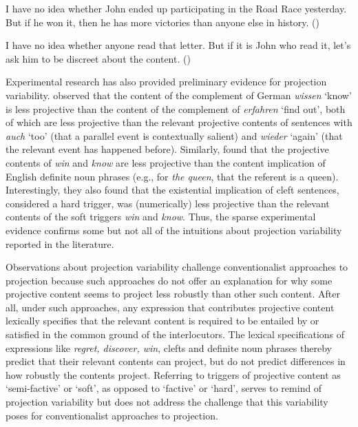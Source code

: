 \documentclass[11pt,fleqn]{article}
\newcommand{\6}{\mbox{$[\hspace*{-.6mm}[$}}
\newcommand{\9}{\mbox{$]\hspace*{-.6mm}]$}}
\def\infelic{{\leavevmode\llap{\#}}}
\begin{document}
\begin{exe}
\ex\label{hardsoft}
\begin{xlist}

\ex I have no idea whether John ended up participating in the Road Race yesterday. But if he won it, then he has more victories than anyone else in history. \hfill (\citealt[39]{abusch10})

\ex\infelic I have no idea whether anyone read that letter. But if it is John
who read it, let's ask him to be discreet about the content. \hfill (\citealt[40]{abusch10})

\end{xlist}
\end{exe}

Experimental research has also provided preliminary evidence for projection variability. \citet{xue-onea11} observed that the content of the complement of German {\em wissen} `know' is less projective than the content of the complement of {\em erfahren} `find out', both of which are less projective than the relevant projective contents of sentences with {\em auch} `too' (that a parallel event is contextually salient) and {\em wieder} `again' (that the relevant event has happened before). Similarly, \citet{smith-hall11} found that the projective contents of {\em win} and {\em know} are less projective than the content implication of English definite noun phrases (e.g., for {\em the queen}, that the referent is a queen). Interestingly, they also found that the existential implication of cleft sentences, considered a hard trigger, was (numerically) less projective than the relevant contents of the soft triggers {\em win} and {\em know}. Thus, the sparse experimental evidence confirms some but not all of the intuitions about projection variability reported in the literature.

Observations about projection variability challenge conventionalist approaches to projection because such approaches do not offer an explanation for why some projective content seems to project less robustly than other such content. After all, under such approaches, any expression that contributes projective content lexically specifies that the relevant content is required to be entailed by or satisfied in the common ground of the interlocutors. The lexical specifications of expressions like {\em regret, discover, win}, clefts and definite noun phrases thereby predict that their relevant contents can project, but do not predict differences in how robustly the contents project. Referring to triggers of projective content as `semi-factive' or `soft', as opposed to `factive' or `hard', serves to remind of projection variability but does not address the challenge that this variability poses for conventionalist approaches to projection.
\end{document}

